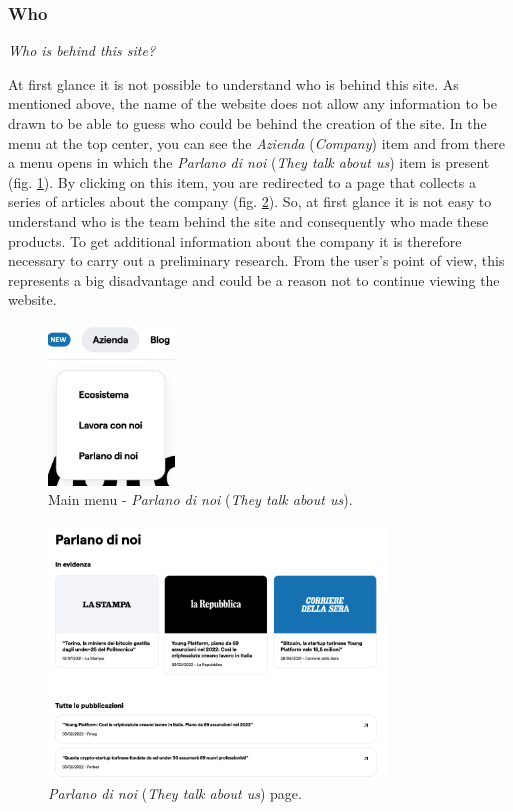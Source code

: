 \subsubsection{Who}

\centerline{\textit{Who is behind this site?}}
At first glance it is not possible to understand who is behind this site. 
As mentioned above, the name of the website does not allow any information 
to be drawn to be able to guess who could be behind the creation of the 
site. In the menu at the top center, you can see the \textit{Azienda} 
(\textit{Company}) item and from there a menu opens in which the 
\textit{Parlano di noi} (\textit{They talk about us}) item is 
present (fig. \ref{fig:who-we-are-1}). By clicking on this item, you are 
redirected to a page that collects a series of articles about the company 
(fig. \ref{fig:who-we-are-2}). So, at first glance it is not easy to 
understand who is the team behind the site and consequently who made 
these products. To get additional information about the company it is 
therefore necessary to carry out a preliminary research. From the 
user's point of view, this represents a big disadvantage and could be a 
reason not to continue viewing the website.

\begin{figure}[H]
	\centering
	\includegraphics[width=0.30\textwidth]{res/images/who-we-are-1.png}
	\caption{Main menu - \textit{Parlano di noi} (\textit{They talk about us}).}
	\label{fig:who-we-are-1}
\end{figure}

\begin{figure}[H]
	\centering
	\includegraphics[width=0.80\textwidth]{res/images/who-we-are-2.png}
	\caption{\textit{Parlano di noi} (\textit{They talk about us}) page.}
	\label{fig:who-we-are-2}
\end{figure}

